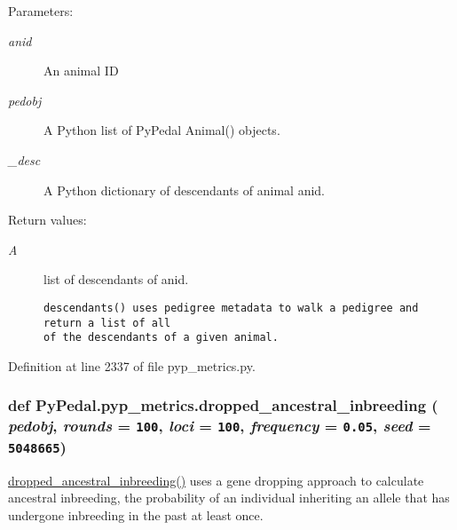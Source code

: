 \begin{Desc}
\item[Parameters:]
\begin{description}
\item[{\em anid}]An animal ID \item[{\em pedobj}]A Python list of Py\-Pedal Animal() objects. \item[{\em \_\-desc}]A Python dictionary of descendants of animal anid. \end{description}
\end{Desc}
\begin{Desc}
\item[Return values:]
\begin{description}
\item[{\em A}]list of descendants of anid.

\footnotesize\begin{verbatim}descendants() uses pedigree metadata to walk a pedigree and return a list of all
of the descendants of a given animal.
\end{verbatim}
\normalsize
 \end{description}
\end{Desc}


Definition at line 2337 of file pyp\_\-metrics.py.\hypertarget{namespacePyPedal_1_1pyp__metrics_e1cfcdb6871cd70b61e99da591975b58}{
\subsubsection[dropped\_\-ancestral\_\-inbreeding]{\setlength{\rightskip}{0pt plus 5cm}def Py\-Pedal.pyp\_\-metrics.dropped\_\-ancestral\_\-inbreeding ( {\em pedobj},  {\em rounds} = {\tt 100},  {\em loci} = {\tt 100},  {\em frequency} = {\tt 0.05},  {\em seed} = {\tt 5048665})}}
\label{namespacePyPedal_1_1pyp__metrics_e1cfcdb6871cd70b61e99da591975b58}


\hyperlink{namespacePyPedal_1_1pyp__metrics_e1cfcdb6871cd70b61e99da591975b58}{dropped\_\-ancestral\_\-inbreeding()} uses a gene dropping approach to calculate ancestral inbreeding, the probability of an individual inheriting an allele that has undergone inbreeding in the past at least once. 

